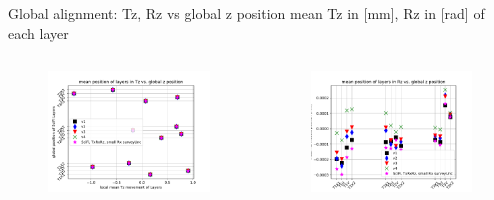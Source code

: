 \documentclass[aspectratio=1610, 12pt]{beamer}
\begin{document}
\begin{frame}{Global alignment: Tz, Rz vs global z position}
  mean Tz in [mm], Rz in [rad] of each layer
  \begin{columns}
    \begin{column}[c]{0.5\textwidth}
      \begin{figure}
        \includegraphics[width=\textwidth]{plots/outfiles_vs_global/all_runs_retest_glob_z_vs_local_Tz.pdf}
      \end{figure}
    \end{column}
    \begin{column}[c]{0.5\textwidth}
      \begin{figure}
        \includegraphics[width=\textwidth]{plots/outfiles_vs_global/all_runs_retest_glob_z_vs_local_Rz.pdf}
      \end{figure}
    \end{column}
  \end{columns}
\end{frame}
\end{document}
